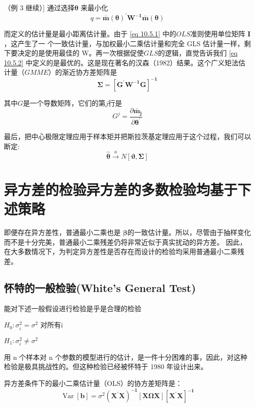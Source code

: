 \begin{myexample}[[实例 4]（例 3 继续）]
         通过选择$ \boldsymbol{\theta} $ 来最小化
         $$ q=\boldsymbol{ \bar{m}(\theta)^{\prime} W^{-1} \bar{m}(\theta)} $$

         而定义的估计量是最小距离估计量。由于 \ref{eq 10.5.1} 中的$ OLS $准则使用单位矩阵 $\boldsymbol{I}$，这产生了一 个一致估计量，与加权最小二乘估计量和完全 GLS 估计量一样，剩下要决定的是使用最佳的 W。再一次根据促使$ GLS $的逻辑，直觉告诉我们 \ref{eq 10.5.2} 中定义的是最优的。这是现在著名的汉森（1982）结果。这个广义矩法估计量（$GMME$）的渐近协方差矩阵是
         $$ \boldsymbol{\Sigma=\left[G^{\prime} W^{-1} G\right]^{-1}} $$

         其中$ G $是一个导数矩阵，它们的第$ j $行是
         $$ G^{j}=\frac{\partial \boldsymbol{\bar{m}_{j}}}{\partial \boldsymbol{\theta^{\prime}}} $$

         最后，把中心极限定理应用于样本矩并把斯拉茨基定理应用于这个过程，我们可以断定:
         $$ \boldsymbol{\hat{\theta}} \stackrel{a}{\longrightarrow} N[\boldsymbol{\vartheta, \Sigma}] $$
 
\end{myexample}
\section{异方差的检验异方差的多数检验均基于下述策略}

    即便存在异方差性，普通最小二乘也是 $ \boldsymbol{\beta} $的一致估计量。所以，尽管由于抽样变化而不是十分完美，普通最小二乘残差仍将非常近似于真实扰动的异方差。
    因此，在大多数情况下，为判定异方差性是否存在而设计的检验均采用普通最小二乘残差。

    \subsection{怀特的一般检验(White’s General Test)}

    能对下述一般假设进行检验是乎是合理的检验
    
    $ H_{0}: \sigma_{i}^{2}=\sigma^{2} $ 对所有$ \mathrm{i} $

    $ H_{1}: \sigma_{i}^{2} \neq \sigma^{2} $

    用 n 个样本对 n 个参数的模型进行的估计，是一件十分困难的事，因此，对这种检验是极具挑战性的。但这种检验已经被怀特于 1980 年设计出来。

    异方差条件下的最小二乘估计量（OLS）的协方差矩阵是：
    $$ \operatorname{Var}[\boldsymbol{b}]=\sigma^{2} \boldsymbol{\left(X^{\prime} X\right)^{-1}[X \Omega X]\left[X^{\prime} X\right]^{-1}} $$

